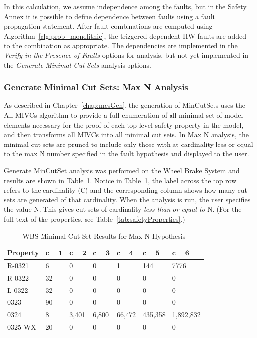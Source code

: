In this calculation, we assume independence among the faults, but in the Safety Annex it is possible to define dependence between faults using a fault propagation statement. After fault combinations are computed using Algorithm~\ref{alg:prob_monolithic}, the triggered dependent HW faults are added to the combination as appropriate. The dependencies are implemented in the \textit{Verify in the Presence of Faults} options for analysis, but not yet implemented in the \textit{Generate Minimal Cut Sets} analysis options.

\subsubsection{Generate Minimal Cut Sets: Max N Analysis}
\label{sec:maxN_generate}
As described in Chapter~\ref{chap:mcsGen}, the generation of MinCutSets uses the All-MIVCs algorithm to provide a full enumeration of all minimal set of model elements necessary for the proof of each top-level safety property in the model, and then transforms all MIVCs into all minimal cut sets. In Max N analysis, the minimal cut sets are pruned to include only those with at cardinality less or equal to the max N number specified in the fault hypothesis and displayed to the user.

Generate MinCutSet analysis was performed on the Wheel Brake System and results are shown in Table~\ref{tab:wbs_maxN_results}. Notice in Table~\ref{tab:wbs_maxN_results}, the label across the top row refers to the cardinality (C) and the corresponding column shows how many cut sets are generated of that cardinality. When the analysis is run, the user specifies the value N. This gives cut sets of cardinality \textit{less than or equal to} N. (For the full text of the properties, see Table~\ref{tab:safetyProperties}.)

\begin{center}
\begin{table}[htbp]
    \begin{tabular}{ | l | l | l | l | l | l | l |}
    \hline
    \textbf{Property} & $\bm{c = 1}$ & $\bm{c = 2}$ & $\bm{c = 3}$ & $\bm{c = 4}$ 
		& $\bm{c = 5}$ & $\bm{c = 6}$   \\ \hline \hline
    R-0321 & 6 & 0 & 0 & 1& 144&7776  \\ \hline
    R-0322 & 32 & 0 & 0 &0 &0 &0 \\ \hline
    L-0322 & 32 & 0 & 0 &0 &0 &0  \\ \hline
    0323 & 90 & 0 & 0 &0 &0 &0 \\ \hline
    0324 & 8 & 3,401 & 6,800 &66,472 & 435,358&1,892,832 \\ \hline
    0325-WX & 20 & 0 & 0 &0 &0 & 0\\ \hline
    \end{tabular}
    \caption{WBS Minimal Cut Set Results for Max N Hypothesis}
    \label{tab:wbs_maxN_results}
\end{table}
\end{center}

